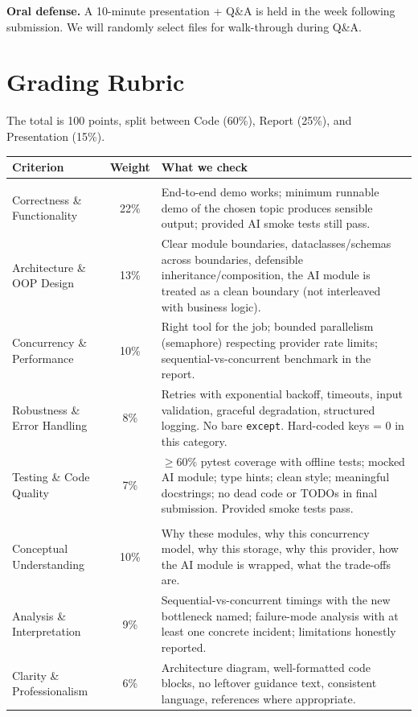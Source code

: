 \documentclass[11pt,a4paper]{article}
\begin{document}
\textbf{Oral defense.} A 10-minute presentation + Q\&A is held in the week following submission. We will randomly select files for walk-through during Q\&A.

\section{Grading Rubric}\label{sec:rubric}
The total is 100 points, split between Code (60\%), Report (25\%), and Presentation (15\%).

\begin{center}\small
\begin{tabular}{>{\raggedright\arraybackslash}p{4.6cm} c >{\raggedright\arraybackslash}p{8.5cm}}
\toprule
\textbf{Criterion} & \textbf{Weight} & \textbf{What we check}\\
\midrule
\multicolumn{3}{l}{\color{accent}\textbf{Code -- 60\%}}\\[2pt]
Correctness \& Functionality & 22\% & End-to-end demo works; minimum runnable demo of the chosen topic produces sensible output; provided AI smoke tests still pass.\\[2pt]
Architecture \& OOP Design & 13\% & Clear module boundaries, dataclasses/schemas across boundaries, defensible inheritance/composition, the AI module is treated as a clean boundary (not interleaved with business logic).\\[2pt]
Concurrency \& Performance & 10\% & Right tool for the job; bounded parallelism (semaphore) respecting provider rate limits; sequential-vs-concurrent benchmark in the report.\\[2pt]
Robustness \& Error Handling & 8\% & Retries with exponential backoff, timeouts, input validation, graceful degradation, structured logging. No bare \texttt{except}. Hard-coded keys = 0 in this category.\\[2pt]
Testing \& Code Quality & 7\% & $\ge 60\%$ pytest coverage with offline tests; mocked AI module; type hints; clean style; meaningful docstrings; no dead code or TODOs in final submission. Provided smoke tests pass.\\[6pt]

\multicolumn{3}{l}{\color{accent}\textbf{Report -- 25\%}}\\[2pt]
Conceptual Understanding & 10\% & Why these modules, why this concurrency model, why this storage, why this provider, how the AI module is wrapped, what the trade-offs are.\\[2pt]
Analysis \& Interpretation & 9\% & Sequential-vs-concurrent timings with the new bottleneck named; failure-mode analysis with at least one concrete incident; limitations honestly reported.\\[2pt]
Clarity \& Professionalism & 6\% & Architecture diagram, well-formatted code blocks, no leftover guidance text, consistent language, references where appropriate.\\[6pt]


\end{tabular}
\end{center}
\end{document}
